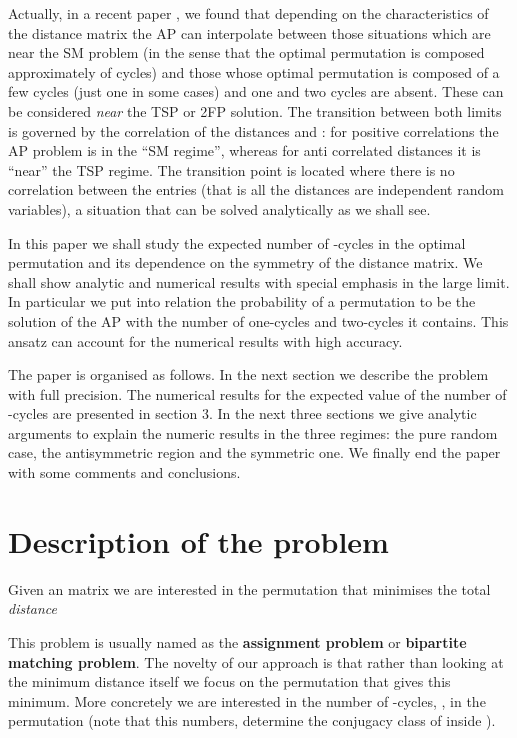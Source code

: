 \documentclass[]{iopart}
\begin{document}
 Actually, in a recent paper \cite{EstFal}, we found that 
 depending on the characteristics of the distance matrix the AP can interpolate
 between those situations which are near the 
 SM problem (in the sense that the optimal permutation is composed
 approximately of  cycles) and those whose 
 optimal permutation is composed of a few cycles 
(just one in some cases) and one and two cycles are absent. 
These can be considered {\it near} the TSP or 2FP solution.
 The transition between both limits is governed by 
 the correlation of the distances  and :
 for positive correlations the AP problem is in
 the ``SM regime'', whereas for anti correlated distances it is
 ``near'' the TSP regime. The transition point is located where there is no
 correlation between the entries 
 (that is all the distances are independent random variables), 
a situation that can be solved analytically as we shall see.


In this paper we shall study the expected number of -cycles in the optimal
permutation and its dependence on the symmetry of the distance matrix. 
We shall show  analytic and numerical results with special emphasis in the 
large   limit. In particular we put into relation the probability of a permutation
to be the solution of the AP with the number of one-cycles and two-cycles 
it contains. This ansatz can account for the numerical results
with high accuracy.

The paper is organised as follows. In the next section we 
describe the problem with full precision. The numerical 
results for the expected value of the number of -cycles
are presented in section 3. In the next three sections
we give analytic arguments to explain the numeric results
in the three regimes: the pure random case, the antisymmetric region 
and the symmetric one. We finally end the paper with some comments and 
conclusions.

\section{Description of the problem}

Given an  matrix  we are interested in the
permutation  that minimises the total {\it distance}

This problem is usually named as the {\bf assignment problem} or 
{\bf bipartite matching problem}.
The novelty of our approach is that rather than looking
at the minimum distance itself we focus on the permutation
 that gives this minimum. More concretely we are interested
in the number of -cycles, ,  in the 
permutation  (note that this numbers, determine the 
conjugacy class of  inside ).
\end{document}
